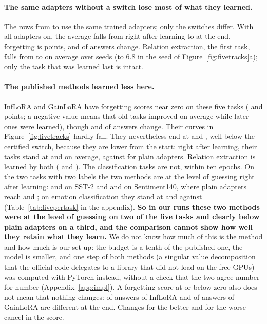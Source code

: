 \paragraph{The same adapters without a switch lose most of what they learned.} The rows from \cert{} to \plain{} use the same trained adapters; only the switches
differ. With all adapters on, the average falls from \FivePlainLearned{} right after learning to
\FivePlainAP{} at the end, forgetting is \FivePlainFT{} points, and \FivePlainChanged{} of
\FivePlainCompared{} answers change. Relation extraction, the first task, falls from
\FivePlainRelationLearned{} to \FivePlainRelationEnd{} on average over seeds (to 6.8 in the seed of
Figure~\ref{fig:fivetracks}a); only the task that was learned last is intact.

\paragraph{The published methods learned less here.} InfLoRA and GainLoRA have forgetting scores near zero on these five tasks
(\FiveInfFT{} and \FiveGainFT{} points; a
negative value means that old tasks improved on average while later ones were learned), though \FiveInfChanged{} and \FiveGainChanged{} of \FiveInfCompared{} answers change. Their curves
in Figure~\ref{fig:fivetracks} hardly fall. They nevertheless end at \FiveInfAP{}
and \FiveGainAP{}, well below the certified switch, because they are lower from the start: right
after learning, their tasks stand at \FiveInfLearned{} and \FiveGainLearned{} on average, against
\FiveCertLearned{} for plain adapters. Relation extraction is learned by both
(\FiveInfRelationLearned{} and \FiveGainRelationLearned{}). The classification tasks are not, within
ten epochs. On the two tasks with two labels the two methods are at the level of guessing right
after learning: \FiveInfSstLearned{} and \FiveGainSstLearned{} on SST-2 and
\FiveInfSentimentLearned{} and \FiveGainSentimentLearned{} on Sentiment140, where plain adapters
reach \FivePlainSstLearned{} and \FivePlainSentimentLearned{}; on emotion classification they stand
at \FiveInfEmotionLearned{} and \FiveGainEmotionLearned{} against \FivePlainEmotionLearned{}
(Table~\ref{tab:fivepertask} in the appendix). \textbf{So in our runs these two methods were at the level of guessing on two of the five tasks and clearly below plain adapters on a third, and the comparison cannot show how well they retain what they learn.} We do not know how much of this is the method and how much is our set-up: the budget is a
tenth of the published one, the model is smaller, and one step of both methods (a singular value
decomposition that the official code delegates to a library that did not load on the free GPUs) was
computed with PyTorch instead, without a check that the two agree number for number
(Appendix~\ref{app:impl}). A forgetting score at or
below zero also does not mean that nothing changes: \FiveInfChanged{} of \FiveInfCompared{} answers of
InfLoRA and \FiveGainChanged{} of \FiveGainCompared{} answers of GainLoRA are different at the end.
Changes for the better and for the worse cancel in the score.

